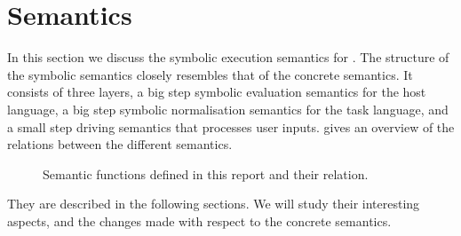 
\section{Semantics}
\label{sec:semantics}

In this section we discuss the symbolic execution semantics for \TOPHAT.
The structure of the symbolic semantics closely resembles that of the concrete semantics.
It consists of three layers, a big step symbolic evaluation semantics for the host language, a big step symbolic normalisation semantics for the task language, and a small step driving semantics that processes user inputs.
 gives an overview of the relations between the different semantics.

\begin{figure}[h]
  \centering
  \caption{
    Semantic functions defined in this report and their relation.
  }
  \label{fig:semantic-functions}
\end{figure}

They are described in the following sections.
We will study their interesting aspects, and the changes made with respect to the concrete semantics.



